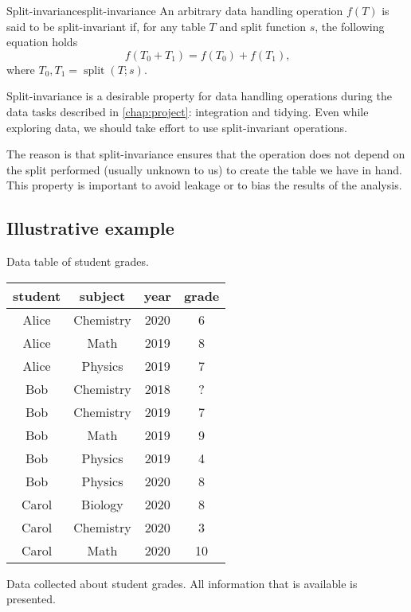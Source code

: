 \begin{defbox}{Split-invariance}{split-invariance}
An arbitrary data handling operation $f(T)$ is said to be split-invariant
if, for any table $T$ and split function $s$, the following equation holds \[
  f\!\left(T_0 + T_1\right) =
    f\!\left(T_0\right) + f\!\left(T_1\right)\text{,}
\] where $T_0, T_1 = \operatorname{split}\!\left(T; s\right)$.
\end{defbox}

Split-invariance is a desirable property for data handling operations during the data
tasks described in \cref{chap:project}: integration and tidying.  Even while exploring
data, we should take effort to use split-invariant operations.

The reason is that split-invariance ensures that the operation does not depend on the
split performed (usually unknown to us) to create the table we have in hand.  This
property is important to avoid \gls{leakage} or to bias the results of the analysis.

\subsection{Illustrative example}

\begin{tablebox}[label=tab:grades1]{Data table of student grades.}
  \centering
  \begin{tabular}{cccc}
    \toprule
    \textbf{student} & \textbf{subject} & \textbf{year} & \textbf{grade} \\
    \midrule
    Alice & Chemistry & 2020 & 6 \\
    Alice & Math & 2019 & 8 \\
    Alice & Physics & 2019 & 7 \\
    Bob & Chemistry & 2018 & ? \\
    Bob & Chemistry & 2019 & 7 \\
    Bob & Math & 2019 & 9 \\
    Bob & Physics & 2019 & 4 \\
    Bob & Physics & 2020 & 8 \\
    Carol & Biology & 2020 & 8 \\
    Carol & Chemistry & 2020 & 3 \\
    Carol & Math & 2020 & 10 \\
    \bottomrule
  \end{tabular}
  \tcblower
  Data collected about student grades.  All information that is available is presented.
\end{tablebox}

